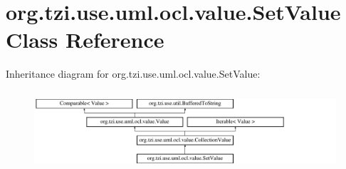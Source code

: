 \hypertarget{classorg_1_1tzi_1_1use_1_1uml_1_1ocl_1_1value_1_1_set_value}{\section{org.\-tzi.\-use.\-uml.\-ocl.\-value.\-Set\-Value Class Reference}
\label{classorg_1_1tzi_1_1use_1_1uml_1_1ocl_1_1value_1_1_set_value}
}
Inheritance diagram for org.\-tzi.\-use.\-uml.\-ocl.\-value.\-Set\-Value\-:\begin{figure}[H]
\begin{center}
\leavevmode
\includegraphics[height=2.974767cm]{classorg_1_1tzi_1_1use_1_1uml_1_1ocl_1_1value_1_1_set_value}
\end{center}
\end{figure}
